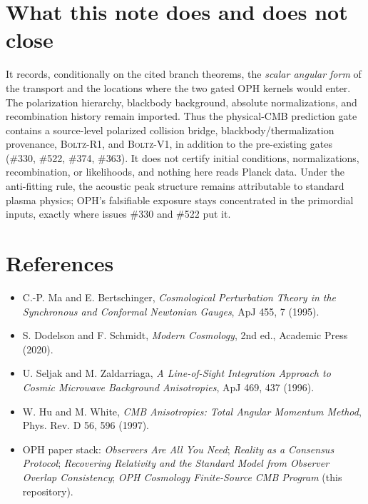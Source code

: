 \documentclass[11pt]{article}
\theoremstyle{remark}
\begin{document}
\section{What this note does and does not close}
It records, conditionally on the cited branch theorems, the \emph{scalar
angular form} of the transport and the locations where the two gated OPH
kernels would enter.  The polarization hierarchy, blackbody background,
absolute normalizations, and recombination history remain imported.  Thus
the physical-CMB prediction gate contains a source-level polarized
collision bridge, blackbody/thermalization provenance, \textsc{Boltz-R1},
and \textsc{Boltz-V1}, in addition to the pre-existing gates (\#330, \#522,
\#374, \#363). It does not certify initial conditions, normalizations,
recombination, or likelihoods, and nothing here reads Planck data. Under the
anti-fitting rule, the acoustic peak structure remains attributable to
standard plasma physics; OPH's falsifiable exposure stays concentrated in
the primordial inputs, exactly where issues \#330 and \#522 put it.

\section*{References}
\begin{itemize}[leftmargin=1.2em]
\item C.-P. Ma and E. Bertschinger, \emph{Cosmological Perturbation Theory
in the Synchronous and Conformal Newtonian Gauges}, ApJ 455, 7 (1995).
\item S. Dodelson and F. Schmidt, \emph{Modern Cosmology}, 2nd ed., Academic
Press (2020).
\item U. Seljak and M. Zaldarriaga, \emph{A Line-of-Sight Integration
Approach to Cosmic Microwave Background Anisotropies}, ApJ 469, 437 (1996).
\item W. Hu and M. White, \emph{CMB Anisotropies: Total Angular Momentum
Method}, Phys. Rev. D 56, 596 (1997).
\item OPH paper stack: \emph{Observers Are All You Need}; \emph{Reality as a
Consensus Protocol}; \emph{Recovering Relativity and the Standard Model from
Observer Overlap Consistency}; \emph{OPH Cosmology Finite-Source CMB
Program} (this repository).
\end{itemize}
\end{document}
